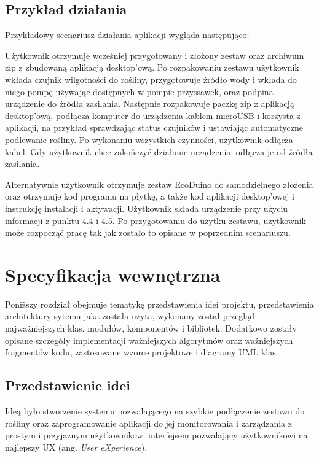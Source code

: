 \documentclass[a4paper,twoside,12pt]{book}
\begin{document}
\section{Przykład działania}

Przykładowy scenariusz działania aplikacji wygląda następująco:

Użytkownik otrzymuje wcześniej przygotowany i złożony zestaw oraz archiwum zip z zbudowaną aplikacją desktop'ową. Po rozpakowaniu zestawu użytkownik wkłada czujnik wilgotności do rośliny, przygotowuje źródło wody i wkłada do niego pompę używając dostępnych w pompie przyssawek, oraz podpina urządzenie do źródła zasilania. Następnie rozpakowuje paczkę zip z aplikacją desktop'ową, podłącza komputer do urządzenia kablem microUSB i korzysta z aplikacji, na przykład sprawdzając status czujników i ustawiając automatyczne podlewanie rośliny. Po wykonaniu wszystkich czynności, użytkownik odłącza kabel. Gdy użytkownik chce zakończyć działanie urządzenia, odłącza je od źródła zasilania.

Alternatywnie użytkownik otrzymuje zestaw EcoDuino do samodzielnego złożenia oraz otrzymuje kod programu na płytkę, a także kod aplikacji desktop'owej i instrukcję instalacji i aktywacji. Użytkownik składa urządzenie przy użyciu informacji z punktu 4.4 i 4.5. Po przygotowaniu do użytku zestawu, użytkownik może rozpocząć pracę tak jak zostało to opisane w poprzednim scenariuszu.

\chapter{Specyfikacja wewnętrzna}

Poniższy rozdział obejmuje tematykę przedstawienia idei projektu, przedstawienia architektury sytemu jaka została użyta, wykonany został przegląd najważniejszych klas, modułów, komponentów i bibliotek. Dodatkowo zostały opisane szczegóły implementacji ważniejszych algorytmów oraz ważniejszych fragmentów kodu, zastosowane wzorce projektowe i diagramy UML klas.

\section{Przedstawienie idei}

Ideą było stworzenie systemu pozwalającego na szybkie podłączenie zestawu do rośliny oraz zaprogramowanie aplikacji do jej monitorowania i zarządzania z prostym i przyjaznym użytkownikowi interfejsem pozwalający użytkownikowi na najlepszy UX (ang. \textit{User eXperience}).
\end{document}
